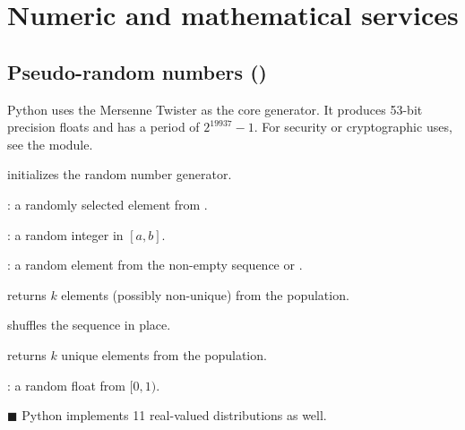 \section{Numeric and mathematical services}
\subsection{Pseudo-random numbers ()}
Python uses the Mersenne Twister as the core generator. It produces 53-bit precision floats and has a period of $2^{19937}-1$.
For security or cryptographic uses, see the  module.

\begin{compactitem}
	\item {} initializes the random number generator.
	\item {}: a randomly selected element from .
	\item {}: a random integer in $[a, b]$.
	\item {}: a random element from the non-empty sequence or .
	\item {} returns $k$ elements (possibly non-unique) from the population.
	\item {} shuffles the sequence in place.
	\item {} returns $k$ unique elements from the population.
	\item {}: a random float from $[0, 1)$.
	\item [$\blacksquare$]Python implements 11 real-valued distributions as well.
\end{compactitem}